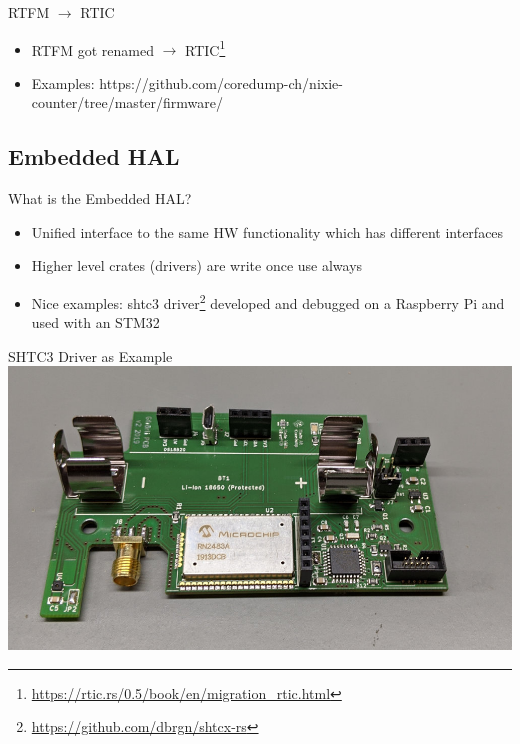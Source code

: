 \documentclass[aspectratio=1610,14pt,t]{beamer}
\begin{document}
\begin{frame}[c]{RTFM $\rightarrow$ RTIC}
  \begin{itemize}
    \item RTFM got renamed $\rightarrow$ RTIC\footnote{\url{https://rtic.rs/0.5/book/en/migration_rtic.html}}
    \item Examples: https://github.com/coredump-ch/nixie-counter/tree/master/firmware/
  \end{itemize}
\end{frame}

\subsection{Embedded HAL}

\begin{frame}[c]{What is the Embedded HAL?}
  \begin{itemize}
  \item Unified interface to the same HW functionality which has different
    interfaces
  \item Higher level crates (drivers) are write once use always
  \item Nice examples: shtc3
    driver\footnote{\url{https://github.com/dbrgn/shtcx-rs}} developed and
    debugged on a  Raspberry Pi and used with an STM32
  \end{itemize}
\end{frame}

\begin{frame}[c]{SHTC3 Driver as Example}
  \includegraphics[height=0.8\textheight]{./img/gfroerli.jpg}
\end{frame}
\end{document}
